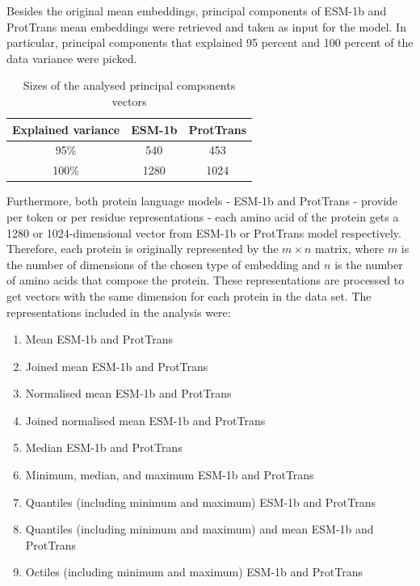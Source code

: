 \documentclass[12pt]{article}
\begin{document}
	Besides the original mean embeddings, principal components 
	of ESM-1b and ProtTrans
	mean embeddings were retrieved and taken as input for the 
	model. In particular, principal components that explained 
	95 percent and 100 percent of the data variance were picked.

	\begin{table}[h!]
		\caption{Sizes of the analysed principal components 
		vectors}
		\vspace{0.2cm}
		\centering
		\begin{tabular}{ | c | c c | }
			\hline 
			Explained variance & ESM-1b & ProtTrans \\
			\hline 
			95\% & 540 & 453 \\
			100\% & 1280 & 1024 \\
			\hline    
		\end{tabular}
		\label{table:vectorsPCADimensions}
	\end{table}
	
	Furthermore, both protein language models - ESM-1b and 
	ProtTrans - provide 
	per token or per residue representations - each 
	amino acid of the protein gets a 1280 or 1024-dimensional vector from
	ESM-1b or ProtTrans model respectively. Therefore, each protein is 
	originally represented by the ${m \times n}$ matrix, 
	where ${m}$ is the number of dimensions of the chosen type of embedding
	and ${n}$ is the number of amino acids that compose the protein. 
	These representations are processed to get vectors with the same 
	dimension 
	for each protein in the data set. The representations 
	included in the analysis were:

	\begin{enumerate}
		\item Mean ESM-1b and ProtTrans 
		\item Joined mean ESM-1b and ProtTrans
		\item Normalised mean ESM-1b and ProtTrans
		\item Joined normalised mean ESM-1b and ProtTrans
		\item Median ESM-1b and ProtTrans
		\item Minimum, median, and maximum ESM-1b and ProtTrans
		\item Quantiles (including minimum and maximum) ESM-1b and ProtTrans
		\item Quantiles (including minimum and maximum) and mean ESM-1b and ProtTrans
		\item Octiles (including minimum and maximum) ESM-1b and ProtTrans
	\end{enumerate}
\end{document}
